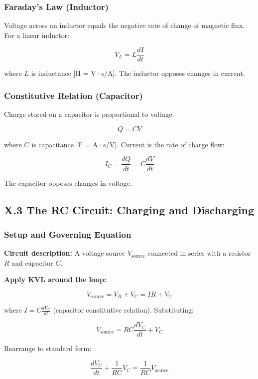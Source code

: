 \documentclass[
]{article}
\begin{document}
\subsubsection{Faraday's Law (Inductor)}\label{faradays-law-inductor}

Voltage across an inductor equals the negative rate of change of
magnetic flux. For a linear inductor:

\[V_L = L\frac{dI}{dt}\]

where \(L\) is inductance {[}H = V·s/A{]}. The inductor opposes changes
in current.

\subsubsection{Constitutive Relation
(Capacitor)}\label{constitutive-relation-capacitor}

Charge stored on a capacitor is proportional to voltage:

\[Q = CV\]

where \(C\) is capacitance {[}F = A·s/V{]}. Current is the rate of
charge flow:

\[I_C = \frac{dQ}{dt} = C\frac{dV}{dt}\]

The capacitor opposes changes in voltage.

\subsection{X.3 The RC Circuit: Charging and
Discharging}\label{x.3-the-rc-circuit-charging-and-discharging}

\subsubsection{Setup and Governing
Equation}\label{setup-and-governing-equation}

\textbf{Circuit description:} A voltage source \(V_{\text{source}}\)
connected in series with a resistor \(R\) and capacitor \(C\).

\textbf{Apply KVL around the loop:}

\[V_{\text{source}} = V_R + V_C = IR + V_C\]

where \(I = C\frac{dV_C}{dt}\) (capacitor constitutive relation).
Substituting:

\[V_{\text{source}} = RC\frac{dV_C}{dt} + V_C\]

Rearrange to standard form:

\[\frac{dV_C}{dt} + \frac{1}{RC}V_C = \frac{1}{RC}V_{\text{source}}\]
\end{document}
